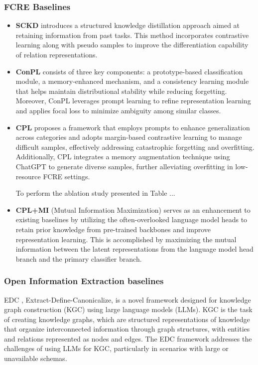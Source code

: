 \subsubsection{FCRE Baselines}
\begin{itemize}
    \item \textbf{SCKD} \citep{DBLP:conf/acl/WangWH23} introduces a structured knowledge distillation approach aimed at retaining information from past tasks. This method incorporates contrastive learning along with pseudo samples to improve the differentiation capability of relation representations.
    
    \item \textbf{ConPL} \citep{DBLP:conf/acl/ChenWS23} consists of three key components: a prototype-based classification module, a memory-enhanced mechanism, and a consistency learning module that helps maintain distributional stability while reducing forgetting. Moreover, ConPL leverages prompt learning to refine representation learning and applies focal loss to minimize ambiguity among similar classes.

    \item \textbf{CPL} \citep{DBLP:conf/coling/MaHL024} proposes a framework that employs prompts to enhance generalization across categories and adopts margin-based contrastive learning to manage difficult samples, effectively addressing catastrophic forgetting and overfitting. Additionally, CPL integrates a memory augmentation technique using ChatGPT to generate diverse samples, further alleviating overfitting in low-resource FCRE settings.

    To perform the ablation study presented in Table ...

    \item \textbf{CPL+MI} \citep{tran-etal-2024-preserving} (Mutual Information Maximization) serves as an enhancement to existing baselines by utilizing the often-overlooked language model heads to retain prior knowledge from pre-trained backbones and improve representation learning. This is accomplished by maximizing the mutual information between the latent representations from the language model head branch and the primary classifier branch.
\end{itemize}

\subsubsection{Open Information Extraction baselines}
EDC \citep{zhang-soh-2024-extract}, Extract-Define-Canonicalize, is a novel framework designed for knowledge graph construction (KGC) using large language models (LLMs). KGC is the task of creating knowledge graphs, which are structured representations of knowledge that organize interconnected information through graph structures, with entities and relations represented as nodes and edges. The EDC framework addresses the challenges of using LLMs for KGC, particularly in scenarios with large or unavailable schemas.

